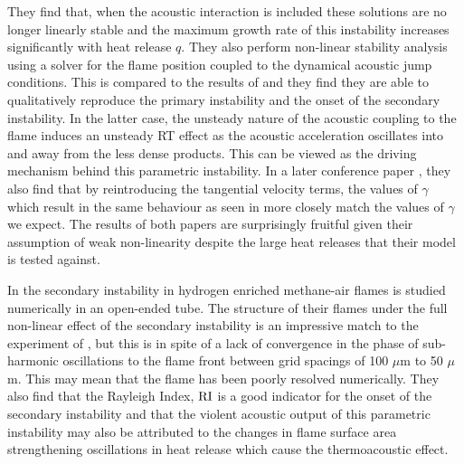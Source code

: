 They find that, when the acoustic interaction is included these solutions are no longer linearly stable and the maximum growth rate of this instability increases significantly with heat release $q$. They also perform non-linear stability analysis using a solver for the flame position coupled to the dynamical acoustic jump conditions. This is compared to the results of \cite{searby1992AcousticInstabilityPremixed} and they find they are able to qualitatively reproduce the primary instability and the onset of the secondary instability. In the latter case, the unsteady nature of the acoustic coupling to the flame induces an unsteady RT effect as the acoustic acceleration oscillates into and away from the less dense products. This can be viewed as the driving mechanism behind this parametric instability. In a later conference paper \cite{assier2014CombustionInstabilityModel}, they also find that by reintroducing the tangential velocity terms, the values of $γ$ which result in the same behaviour as seen in \cite{searby1992AcousticInstabilityPremixed} more closely match the values of $γ$ we expect. The results of both papers are surprisingly fruitful given their assumption of weak non-linearity despite the large heat releases that their model is tested against.


In \cite{jun2023ParametricInstabilityPropagating} the secondary instability in hydrogen enriched methane-air flames is studied numerically in an open-ended tube. The structure of their flames under the full non-linear effect of the secondary instability is an impressive match to the experiment of \cite{ebieto2017DynamicsPremixedFlames}, but this is in spite of a lack of convergence in the phase of sub-harmonic oscillations to the flame front between grid spacings of 100 $μ$m to 50 $μ$m. This may mean that the flame has been poorly resolved numerically. They also find that the Rayleigh Index, $\rm{RI}$ is a good indicator for the onset of the secondary instability and that the violent acoustic output of this parametric instability may also be attributed to the changes in flame surface area strengthening oscillations in heat release which cause the thermoacoustic effect.



